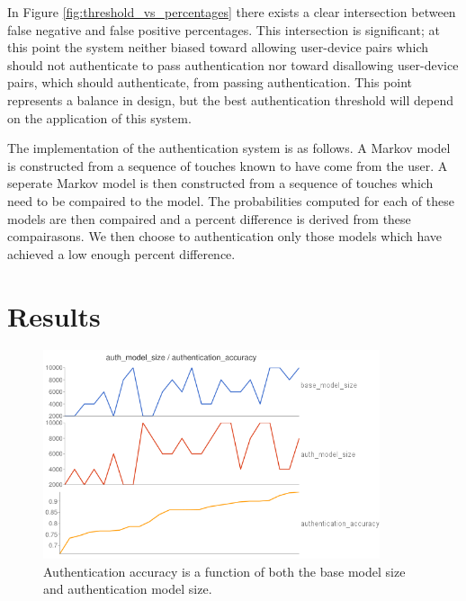 \documentclass{acm_proc_article-sp}
\begin{document}
In Figure \ref{fig:threshold_vs_percentages} there exists a clear intersection between false negative and false positive percentages. This intersection is significant; at this point the system neither biased toward allowing user-device pairs which should not authenticate to pass authentication nor toward disallowing user-device pairs, which should authenticate, from passing authentication. This point represents a balance in design, but the best authentication threshold will depend on the application of this system.

The implementation of the authentication system is as follows. A Markov model is constructed from a sequence of touches known to have come from the user. A seperate Markov model is then constructed from a sequence of touches which need to be compaired to the model. The probabilities computed for each of these models are then compaired and a percent difference is derived from these compairasons. We then choose to authentication only those models which have achieved a low enough percent difference.

\section{Results}
\label{sec:results}

\begin{figure}
\centering
\includegraphics[width=3.9in]{authentication_accuracy_vs_model_size.png}
\caption{Authentication accuracy is a function of both the base model size and authentication model size.}
\label{fig:authentication_accuracy}
\end{figure}
\end{document}
